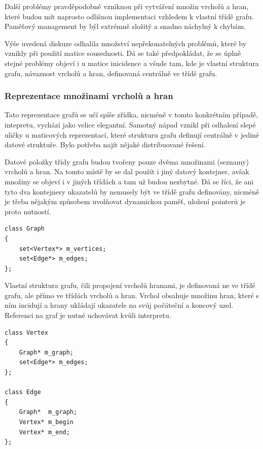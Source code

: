 \documentclass[11pt,twoside,a4paper]{book}
\begin{document}
Další problémy pravděpodobně vzniknou při vytváření množin vrcholů a hran, které budou mít naprosto odlišnou implementaci vzhledem k vlastní třídě grafu. Paměťový management by býl extrémně složitý a snadno náchylný k chybám.

Výše uvedená diskuze odhalila množství nepřekonatelných problémů, které by vznikly při použití matice sousednosti. Dá se také předpokládat, že se úplně stejné problémy objeví i u matice inicidence a všude tam, kde je vlastní struktura grafu, návaznost vrcholů a hran, definovaná centrálně ve třídě grafu.


\subsubsection{Reprezentace množinami vrcholů a hran}
\label{reprezentace_mnozinami_vrcholu_a_hran}

Tato reprezentace grafů se učí spíše zřídka, nicméně v tomto konkrétním případě, intepretu, vychází jako velice elegantní. Samotný nápad vznikl při odhalení slepé uličky u maticových reprezentací, které strukturu grafu definují centrálně v jediné datové struktuře. Bylo potřeba najít nějaké distribuované řešení.

Datové položky třídy grafu budou tvořeny pouze dvěma množinami (seznamy) vrcholů a hran. Na tomto místě by se dal použít i jiný datový kontejner, avšak množiny se objeví i v jiných třídách a tam už budou nezbytné. Dá se říci, že ani tyto dva kontejnery ukazatelů by nemusely být ve třídě grafu definovány, nicméně je třeba nějakým způsobem uvolňovat dynamickou paměť, uložení pointerů je proto nutností.

\begin{verbatim}
class Graph
{
    set<Vertex*> m_vertices;
    set<Edge*> m_edges;
};
\end{verbatim}

Vlastní struktura grafu, čili propojení vrcholů hranami, je definovaná ne ve třídě grafu, ale přímo ve třídách vrcholů a hran. Vrchol obsahuje množinu hran, které s ním incidují a hrany ukládají ukazatele na svůj počáteční a koncový uzel. Referenci na graf je nutné uchovávat kvůli interpretu.

\begin{verbatim}
class Vertex
{
    Graph* m_graph;
    set<Edge*> m_edges;
};

class Edge
{
    Graph*  m_graph;
    Vertex* m_begin
    Vertex* m_end;
};
\end{verbatim}
\end{document}
